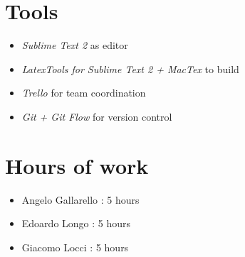 \begin{appendices}
\section{Tools}

\begin{itemize}
	\item \emph{Sublime Text 2} as editor
	\item \emph{LatexTools for Sublime Text 2 + MacTex}  to build
	\item \emph{Trello} for team coordination 
	\item \emph{Git + Git Flow} for version control 
\end{itemize}

\section{Hours of work}

\begin{itemize}
	\item Angelo Gallarello : 5 hours
	\item Edoardo Longo : 5 hours
	\item Giacomo Locci : 5 hours
\end{itemize}



\end{appendices}